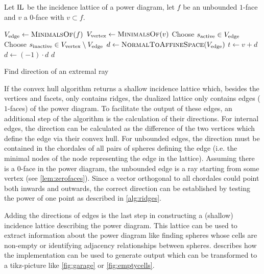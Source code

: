 \begin{algorithm}[tbp]
    Let $\operatorname{IL}$ be the incidence lattice of a power diagram, let $f$ be an unbounded $1$-face and $v$ a $0$-face with $v \subset f$.
    \begin{algorithmic}[1]
        \State $V_{\textnormal{edge}} \gets \Call{MinimalsOf}{f}$
            \State $V_{\textnormal{vertex}} \gets \Call{MinimalsOf}{v}$
            \State Choose $s_{\textnormal{active}} \in V_{\textnormal{edge}}$
            \State Choose $s_{\textnormal{inactive}} \in V_{\textnormal{vertex}} \setminus V_{\textnormal{edge}}$
            \Statex
            \State $d \gets \Call{NormalToAffineSpace}{V_{\textnormal{edge}}}$
            \State $t \gets v + d$
                \State $d \gets (-1) \cdot d$
            \EndIf
            \State \Return $d$
        \EndFunction
    \end{algorithmic}
    \caption{Find direction of an extremal ray}
    \label{alg:ridges}
\end{algorithm}
If the convex hull algorithm returns a shallow incidence lattice which, besides the vertices and facets, only contains ridges, the dualized lattice only contains edges ($1$-faces) of the power diagram.
To facilitate the output of these edges, an additional step of the algorithm is the calculation of their directions.
For internal edges, the direction can be calculated as the difference of the two vertices which define the edge via their convex hull.
For unbounded edges, the direction must be contained in the chordales of all pairs of spheres defining the edge (i.e. the minimal nodes of the node representing the edge in the lattice).
Assuming there is a $0$-face in the power diagram, the unbounded edge is a ray starting from some vertex (see \cref{lem:zerofaces}).
Since a vector orthogonal to all chordales could point both inwards and outwards, the correct direction can be established by testing the power of one point as described in \cref{alg:ridges}.

Adding the directions of edges is the last step in constructing a (shallow) incidence lattice describing the power diagram.
This lattice can be used to extract information about the power diagram like finding spheres whose cells are non-empty or identifying adjacency relationships between spheres.
 describes how the implementation can be used to generate output which can be transformed to a tikz-picture like \cref{fig:garage} or \cref{fig:emptycells}.

